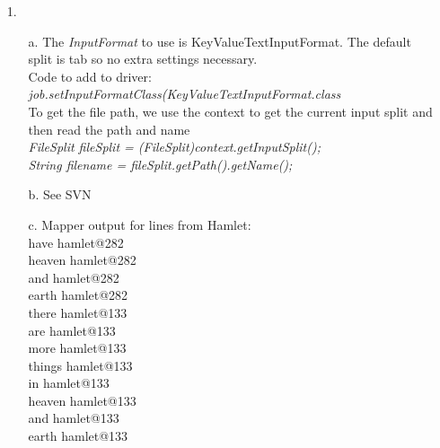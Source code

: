 \documentclass{article}
\begin{document}
\begin{itemize}

\item[1.] 
	\begin{itemize}
		\item[a.] The \textit{InputFormat} to use is KeyValueTextInputFormat. The default split is tab so no extra settings necessary.\\
			Code to add to driver: \textit{job.setInputFormatClass(KeyValueTextInputFormat.class}\\
			To get the file path, we use the context to get the current input split and then read the path and name\\
			\textit{FileSplit fileSplit = (FileSplit)context.getInputSplit();}\\
			\textit{String filename = fileSplit.getPath().getName();}\\
		\item[b.] See SVN
		\item[c.] Mapper output for lines from Hamlet:\\
			have	hamlet@282\\
			heaven	hamlet@282\\
			and	hamlet@282\\
			earth	hamlet@282\\
			there	hamlet@133\\
			are	hamlet@133\\
			more	hamlet@133\\
			things	hamlet@133\\
			in	hamlet@133\\
			heaven	hamlet@133\\
			and	hamlet@133\\
			earth	hamlet@133\\
	\end{itemize}


\end{itemize}
\end{document}

